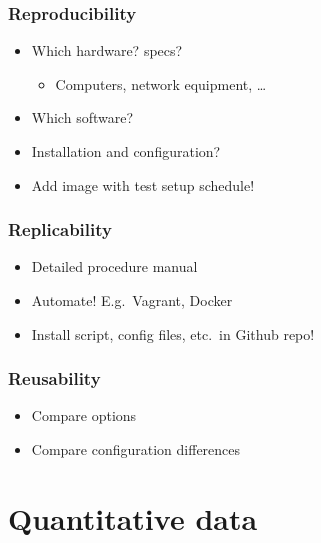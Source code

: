 \documentclass[aspectratio=169]{beamer}
\begin{document}
\begin{frame}
  \frametitle{Reproducibility}


  \bigskip

  \begin{itemize}
    \item Which hardware? specs?
          \begin{itemize}
            \item Computers, network equipment, \ldots
          \end{itemize}
    \item Which software?
    \item Installation and configuration?
    \item Add image with test setup schedule!
  \end{itemize}

\end{frame}

\begin{frame}
  \frametitle{Replicability}


  \bigskip

  \begin{itemize}
    \item Detailed procedure manual
    \item Automate! E.g.\ Vagrant, Docker
    \item Install script, config files, etc.\ in Github repo!
  \end{itemize}

\end{frame}

\begin{frame}
  \frametitle{Reusability}


  \bigskip

  \begin{itemize}
    \item Compare options
    \item Compare configuration differences
  \end{itemize}

\end{frame}

\section{Quantitative data}
\end{document}
